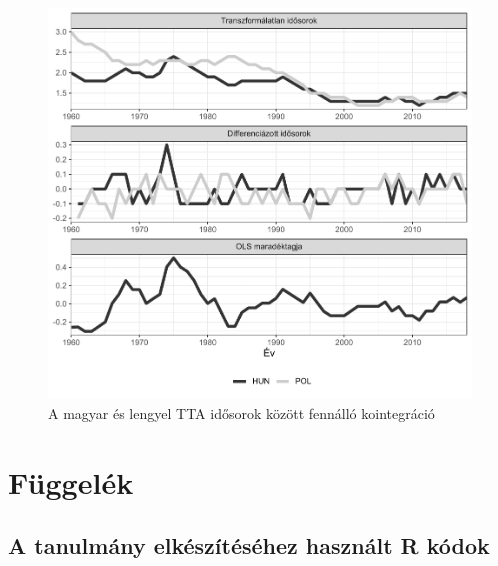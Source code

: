 \documentclass[
]{article}
\begin{document}
\begin{figure}
\centering
\includegraphics{ujdemografiaiprogram_files/figure-latex/unnamed-chunk-19-1.pdf}
\caption{A magyar és lengyel TTA idősorok között fennálló kointegráció}
\end{figure}

\pagebreak

\nocite{*}




\hypertarget{fuxfcggeluxe9k}{%
\section{Függelék}\label{fuxfcggeluxe9k}}

\hypertarget{a-tanulmuxe1ny-elkuxe9szuxedtuxe9suxe9hez-hasznuxe1lt-r-kuxf3dok}{%
\subsection{A tanulmány elkészítéséhez használt R
kódok}\label{a-tanulmuxe1ny-elkuxe9szuxedtuxe9suxe9hez-hasznuxe1lt-r-kuxf3dok}}
\end{document}
